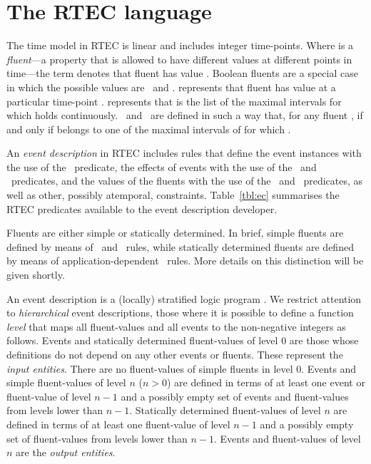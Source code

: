 \section{The RTEC language}\label{sec:RTEC-language}

The time model in RTEC is linear and includes integer time-points. Where  is a \emph{fluent}---a property that is allowed to have different values at different points in time---the term  denotes that fluent  has value . Boolean fluents are a special case in which the possible values are \true\ and \false.  represents that fluent  has value  at a particular time-point .  represents that  is the list of the maximal intervals for which  holds continuously. \holdsAt\ and \holdsFor\ are defined in such a way that, for any fluent ,  if and only if  belongs to one of the maximal intervals of  for which . 

An \emph{event description} in RTEC includes rules that define the event instances with the use of the \happensAt\ predicate, the effects of events with the use of the \initiatedAt\ and \terminatedAt\ predicates, and the values of the fluents with the use of the \holdsAt\ and \holdsFor\ predicates, as well as other, possibly atemporal, constraints. Table~\ref{tbl:ec} summarises the RTEC predicates available to the event description developer. 

Fluents are either simple or statically determined. In brief, simple fluents are defined by means of \initiatedAt\ and \terminatedAt\ rules, while statically determined fluents are defined by means of application-dependent \holdsFor\ rules. More details on this distinction will be given shortly.

An event description is a (locally) stratified logic program \cite{local-strat}.
We restrict attention to \emph{hierarchical} event descriptions, those where it is possible to define a function \emph{level} that maps all fluent-values  and all events to the non-negative integers as follows. 
Events and statically determined fluent-values  of level $0$ are those whose  definitions do not depend on any other events or fluents. These represent the \emph{input entities}. There are no fluent-values  of simple fluents  in level $0$. 
Events and simple fluent-values of level $n$ ($n>0$) are defined in terms of at least one event or fluent-value of level $n{-}1$ and a possibly empty set of events and fluent-values from levels lower than $n{-}1$. Statically determined fluent-values of level $n$ are defined in terms of at least one fluent-value of level $n{-}1$ and a possibly empty set of fluent-values from levels lower than $n{-}1$. 
Events and fluent-values of level $n$ are the \emph{output entities}.


